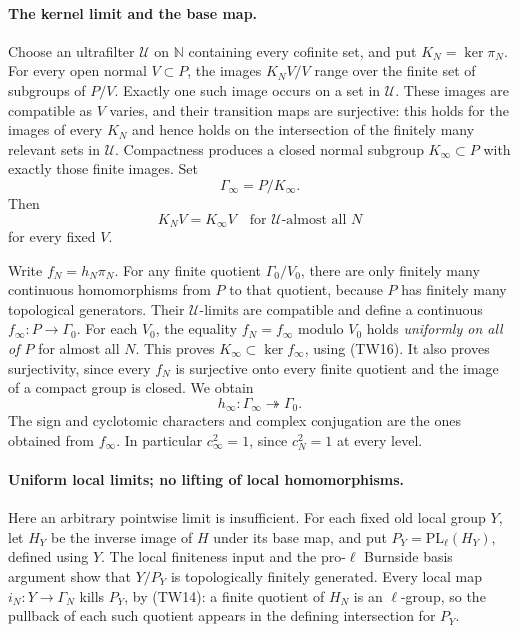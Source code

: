 \paragraph{The kernel limit and the base map.}
Choose an ultrafilter \(\mathcal U\) on \(\mathbb N\) containing
every cofinite set, and put \(K_N=\ker\pi_N\).
For every open normal \(V\subset P\), the images \(K_NV/V\)
range over the finite set of subgroups of \(P/V\).
Exactly one such image occurs on a set in \(\mathcal U\).
These images are compatible as \(V\) varies, and their transition
maps are surjective: this holds for the images of every \(K_N\)
and hence holds on the intersection of the finitely many
relevant sets in \(\mathcal U\).
Compactness produces a closed normal subgroup \(K_\infty\subset P\)
with exactly those finite images.
Set
\[
                        \Gamma_\infty=P/K_\infty .
\]
Then
\[
                K_NV=K_\infty V
                   \quad\text{for \(\mathcal U\)-almost all }N
 \tag{TW16}
\]
for every fixed \(V\).

Write \(f_N=h_N\pi_N\).
For any finite quotient \(\Gamma_0/V_0\), there are only finitely
many continuous homomorphisms from \(P\) to that quotient,
because \(P\) has finitely many topological generators.
Their \(\mathcal U\)-limits are compatible and define
a continuous \(f_\infty:P\to\Gamma_0\).
For each \(V_0\), the equality \(f_N=f_\infty\) modulo \(V_0\)
holds \emph{uniformly on all of \(P\)} for almost all \(N\).
This proves \(K_\infty\subset\ker f_\infty\), using (TW16).
It also proves surjectivity, since every \(f_N\) is surjective
onto every finite quotient and the image of a compact group
is closed.
We obtain
\[
                      h_\infty:\Gamma_\infty
                                      \twoheadrightarrow\Gamma_0 .
 \tag{TW17}
\]
The sign and cyclotomic characters and complex conjugation are
the ones obtained from \(f_\infty\).
In particular \(c_\infty^2=1\), since \(c_N^2=1\) at every level.

\paragraph{Uniform local limits; no lifting of local homomorphisms.}
Here an arbitrary pointwise limit is insufficient.
For each fixed old local group \(Y\), let
\(H_Y\) be the inverse image of \(H\) under its base map, and put
\(P_Y=\mathrm{PL}_\ell(H_Y)\), defined using \(Y\).
The local finiteness input and the pro-\(\ell\) Burnside basis
argument show that \(Y/P_Y\) is topologically finitely generated.
Every local map \(i_N:Y\to\Gamma_N\) kills \(P_Y\), by (TW14):
a finite quotient of \(H_N\) is an \(\ell\)-group, so the
pullback of each such quotient appears in the defining
intersection for \(P_Y\).

